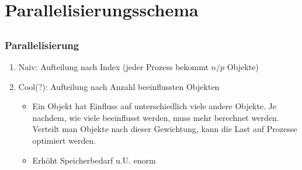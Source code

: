 \documentclass{beamer}
\begin{document}

\section{Parallelisierungsschema}
\subsection{}


\begin{frame}
    \frametitle{Parallelisierung}
    \begin{enumerate}
        \item Naiv: Aufteilung nach Index (jeder Prozess bekommt $n/p$ Objekte)
        \item Cool(?): Aufteilung nach Anzahl beeinflussten Objekten
        \begin{itemize}
            \item Ein Objekt hat Einfluss auf unterschiedlich viele andere Objekte.
                Je nachdem, wie viele beeinflusst werden, muss mehr berechnet werden.
                Verteilt man Objekte nach dieser Gewichtung, kann die Last auf Prozesse
                optimiert werden.
            \item Erhöht Speicherbedarf u.U. enorm
        \end{itemize}
    \end{enumerate}
\end{frame}

\end{document}
